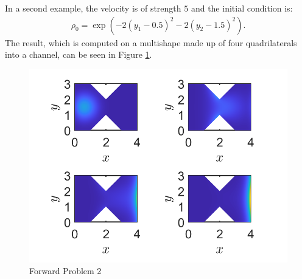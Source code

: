 \documentclass[11pt, a4paper]{article}
\theoremstyle{definition}
\begin{document}
In a second example, the velocity is of strength $5$ and the initial condition is:
 \begin{align*}
	\rho_0 = \exp( -2(y_1 -0.5)^2 - 2 (y_2 - 1.5)^2).
\end{align*}
The result, which is computed on a multishape made up of four quadrilaterals into a channel, can be seen in Figure \ref{F9}.

\begin{figure}[h]
	\centering
	\includegraphics[scale=0.5]{ex2.png}
	\caption{Forward Problem 2}
	\label{F9}
\end{figure}








\pagebreak	


\end{document}
